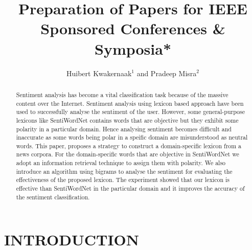 \documentclass[a4paper, 10pt, conference]{ieeeconf}
\title{\LARGE \bf
	Preparation of Papers for IEEE Sponsored Conferences \& Symposia*
}
\author{Huibert Kwakernaak$^{1}$ and Pradeep Misra$^{2}$%
}
\begin{document}
	
	
	
	\maketitle
	\thispagestyle{empty}
	\pagestyle{empty}
	
	
	\begin{abstract}
		
		Sentiment analysis has become a vital classification task because of the massive content over the Internet. Sentiment analysis using lexicon based approach  have been used to successfully analyse the sentiment of the user. However, some general-purpose lexicons like SentiWordNet contains words that are objective but they exhibit some polarity in a particular domain. Hence analysing sentiment becomes difficult and inaccurate as some words being polar in a speific domain are misunderstood as neutral words. This
		paper, proposes a strategy to construct a domain-specific lexicon from a news corpora. For the domain-specific words that are objective in SentiWordNet  we adopt an information retrieval technique to assign them with polarity.	We also introduce an algorithm using bigrams to analyse the sentiment for evaluating the effectiveness of the proposed lexicon.  The experiment showed that our lexicon is effective than SentiWordNet in the particular domain and it improves the accuracy of the sentiment classification.
		
	\end{abstract}
	
	
	\section{INTRODUCTION}
	
\end{document}
